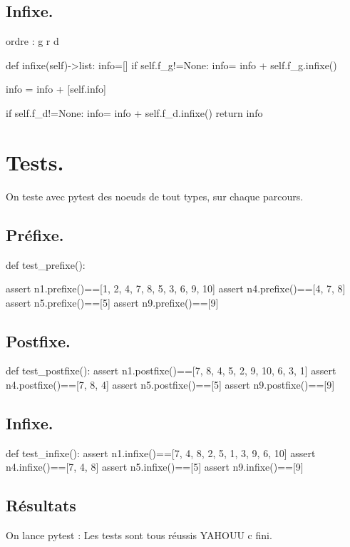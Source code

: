 \documentclass{article}
\begin{document}
\subsection{Infixe.}
ordre : g r d
\begin{python}
    def infixe(self)->list:
    info=[]
    if self.f_g!=None:
        info= info + self.f_g.infixe() 
         
    info = info + [self.info]
    
    if self.f_d!=None:
        info= info + self.f_d.infixe()
    return info
\end{python}
\section{Tests.}
On teste avec pytest des noeuds de tout types, sur chaque parcours.
\subsection{Préfixe.}

\begin{python}
    def test_prefixe():
    
    assert n1.prefixe()==[1, 2, 4, 7, 8, 5, 3, 6, 9, 10]
    assert n4.prefixe()==[4, 7, 8]
    assert n5.prefixe()==[5]
    assert n9.prefixe()==[9]
\end{python}

\subsection{Postfixe.}

\begin{python}
    def test_postfixe():
assert n1.postfixe()==[7, 8, 4, 5, 2, 9, 10, 6, 3, 1]
assert n4.postfixe()==[7, 8, 4]
assert n5.postfixe()==[5]
assert n9.postfixe()==[9]
\end{python}

\subsection{Infixe.}

\begin{python}
    def test_infixe():
    assert n1.infixe()==[7, 4, 8, 2, 5, 1, 3, 9, 6, 10]
    assert n4.infixe()==[7, 4, 8]
    assert n5.infixe()==[5]
    assert n9.infixe()==[9]
\end{python}
\subsection{Résultats}
On lance pytest : 
Les tests sont tous réussis YAHOUU c fini.
\end{document}
